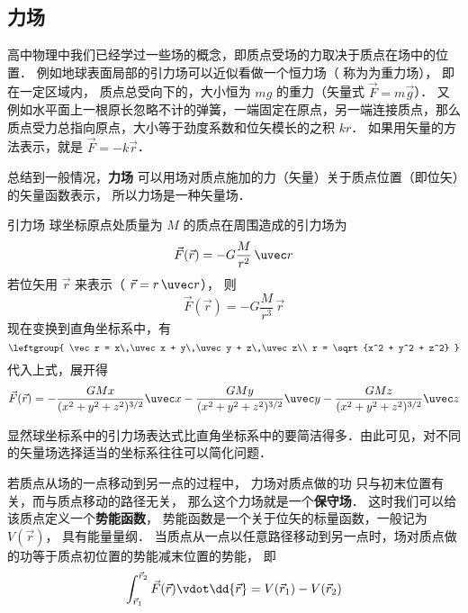 

\subsection{力场}
高中物理中我们已经学过一些场的概念，即质点受场的力取决于质点在场中的位置． 例如地球表面局部的引力场可以近似看做一个恒力场（ 称为为重力场）， 即在一定区域内， 质点总受向下的，大小恒为 $mg$ 的重力（矢量式 $\vec F = m\vec g$）． 又例如水平面上一根原长忽略不计的弹簧，一端固定在原点，另一端连接质点，那么质点受力总指向原点，大小等于劲度系数和位矢模长的之积 $kr$． 如果用矢量的方法表示，就是 $\vec F = -k\vec r$．

总结到一般情况，\textbf{力场} 可以用场对质点施加的力（矢量）关于质点位置（即位矢）的矢量函数表示， 所以力场是一种矢量场．


\begin{exam}{引力场}\label{V_ex1}
球坐标原点处质量为 $M$ 的质点在周围造成的引力场为
\begin{equation}
\vec F(\vec r) =  - G\frac{M}{r^2}\,\uvec r
\end{equation} 
若位矢用 $\vec r$ 来表示（ $\vec r = r\,\uvec r$）， 则
\begin{equation}
\vec F(\vec r) =  - G\frac{M}{r^3}\,\vec r
\end{equation}
现在变换到直角坐标系中，有
\begin{equation}
\leftgroup{
\vec r = x\,\uvec x + y\,\uvec y + z\,\uvec z\\
r = \sqrt{x^2 + y^2 + z^2} 
}\end{equation} 
代入上式，展开得
\begin{equation}
\vec F(\vec r) =  - \frac{GMx}{(x^2+y^2+z^2)^{3/2}}\uvec x - \frac{GMy}{(x^2 +y^2+z^2)^{3/2}}\uvec y - \frac{GMz}{(x^2+y^2+z^2)^{3/2}}\uvec z 
\end{equation} 

显然球坐标系中的引力场表达式比直角坐标系中的要简洁得多．由此可见，对不同的矢量场选择适当的坐标系往往可以简化问题．
\end{exam}

若质点从场的一点移动到另一点的过程中， 力场对质点做的功 只与初末位置有关，而与质点移动的路径无关， 那么这个力场就是一个\textbf{保守场}． 这时我们可以给该质点定义一个\textbf{势能函数}， 势能函数是一个关于位矢的标量函数，一般记为 $V(\vec r)$， 具有能量量纲． 当质点从一点以任意路径移动到另一点时，场对质点做的功等于质点初位置的势能减末位置的势能， 即
\begin{equation}\label{V_eq1}
\int_{\vec r_1}^{\vec r_2} \vec F(\vec r) \vdot \dd{\vec r} = V(\vec r_1)-V(\vec r_2)
\end{equation}


